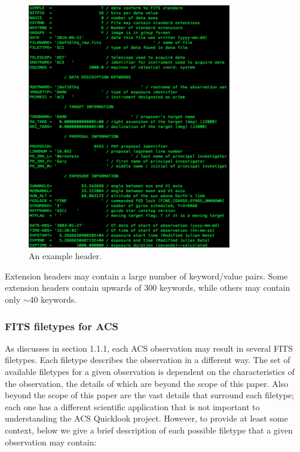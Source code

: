 \documentclass[10pt,journal,compsoc]{IEEEtran}
\begin{document}
\begin{figure}[!t]
\centering
\includegraphics[width=3.5in]{./figures/header_example.png}
\caption{An example header.}
\label{fig1}
\end{figure}

Extension headers may contain a large number of keyword/value pairs.  Some extension
headers contain upwards of 300 keywords, while others may contain only $\sim$40 keywords.

\subsubsection{FITS filetypes for ACS}

As discusses in section 1.1.1, each ACS observation may result in several FITS filetypes.
Each filetype describes the observation in a different way.  The set of available
filetypes for a given observation is dependent on the characteristics of the observation,
the details of which are beyond the scope of this paper.  Also beyond the scope of this
paper are the vast details that surround each filetype; each one has a different scientific
application that is not important to understanding the ACS Quicklook project.  However,
to provide at least some context, below we give a brief description of each possible
filetype that a given observation may contain:
\end{document}
